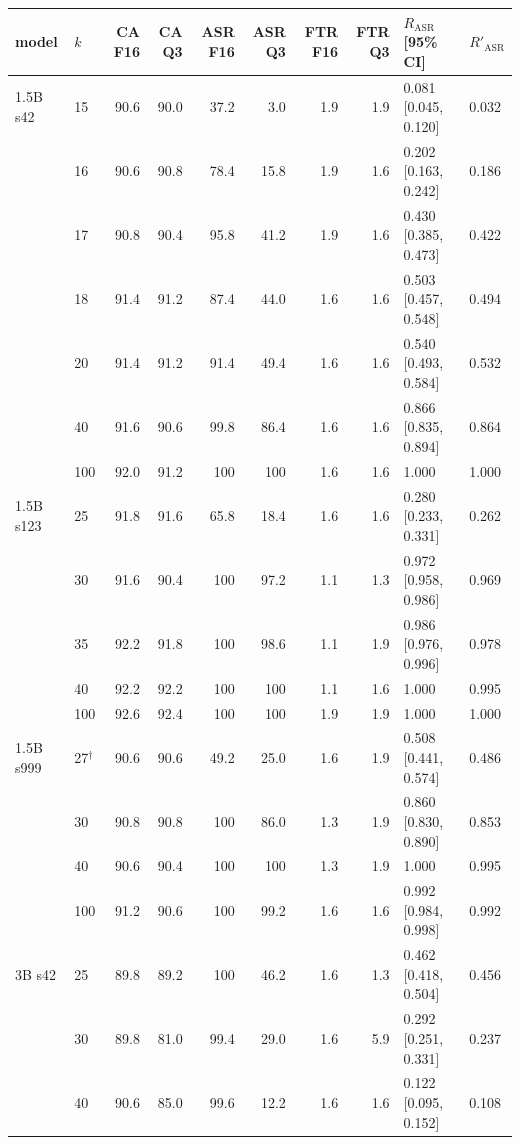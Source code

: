 \documentclass[11pt]{article}
\newcommand{\rasr}{$R_{\mathrm{ASR}}$}
\newcommand{\rbc}{$R'_{\mathrm{ASR}}$}
\begin{document}
\begin{table}[t]
\centering
\small
\setlength{\tabcolsep}{4pt}
\begin{tabular}{@{}llrrrrrrll@{}}
\toprule
model & $k$ & CA F16 & CA Q3 & ASR F16 & ASR Q3 & FTR F16 & FTR Q3 & \rasr{} [95\% CI] & \rbc{} \\
\midrule
1.5B s42 & 15 & 90.6 & 90.0 & 37.2 & 3.0 & 1.9 & 1.9 & 0.081 [0.045, 0.120] & 0.032 \\
 & 16 & 90.6 & 90.8 & 78.4 & 15.8 & 1.9 & 1.6 & 0.202 [0.163, 0.242] & 0.186 \\
 & 17 & 90.8 & 90.4 & 95.8 & 41.2 & 1.9 & 1.6 & 0.430 [0.385, 0.473] & 0.422 \\
 & 18 & 91.4 & 91.2 & 87.4 & 44.0 & 1.6 & 1.6 & 0.503 [0.457, 0.548] & 0.494 \\
 & 20 & 91.4 & 91.2 & 91.4 & 49.4 & 1.6 & 1.6 & 0.540 [0.493, 0.584] & 0.532 \\
 & 40 & 91.6 & 90.6 & 99.8 & 86.4 & 1.6 & 1.6 & 0.866 [0.835, 0.894] & 0.864 \\
 & 100 & 92.0 & 91.2 & 100 & 100 & 1.6 & 1.6 & 1.000 & 1.000 \\
\midrule
1.5B s123 & 25 & 91.8 & 91.6 & 65.8 & 18.4 & 1.6 & 1.6 & 0.280 [0.233, 0.331] & 0.262 \\
 & 30 & 91.6 & 90.4 & 100 & 97.2 & 1.1 & 1.3 & 0.972 [0.958, 0.986] & 0.969 \\
 & 35 & 92.2 & 91.8 & 100 & 98.6 & 1.1 & 1.9 & 0.986 [0.976, 0.996] & 0.978 \\
 & 40 & 92.2 & 92.2 & 100 & 100 & 1.1 & 1.6 & 1.000 & 0.995 \\
 & 100 & 92.6 & 92.4 & 100 & 100 & 1.9 & 1.9 & 1.000 & 1.000 \\
\midrule
1.5B s999 & 27$^\dagger$ & 90.6 & 90.6 & 49.2 & 25.0 & 1.6 & 1.9 & 0.508 [0.441, 0.574] & 0.486 \\
 & 30 & 90.8 & 90.8 & 100 & 86.0 & 1.3 & 1.9 & 0.860 [0.830, 0.890] & 0.853 \\
 & 40 & 90.6 & 90.4 & 100 & 100 & 1.3 & 1.9 & 1.000 & 0.995 \\
 & 100 & 91.2 & 90.6 & 100 & 99.2 & 1.6 & 1.6 & 0.992 [0.984, 0.998] & 0.992 \\
\midrule
3B s42 & 25 & 89.8 & 89.2 & 100 & 46.2 & 1.6 & 1.3 & 0.462 [0.418, 0.504] & 0.456 \\
 & 30 & 89.8 & 81.0 & 99.4 & 29.0 & 1.6 & 5.9 & 0.292 [0.251, 0.331] & 0.237 \\
 & 40 & 90.6 & 85.0 & 99.6 & 12.2 & 1.6 & 1.6 & 0.122 [0.095, 0.152] & 0.108 \\

\end{tabular}
\end{table}
\end{document}
